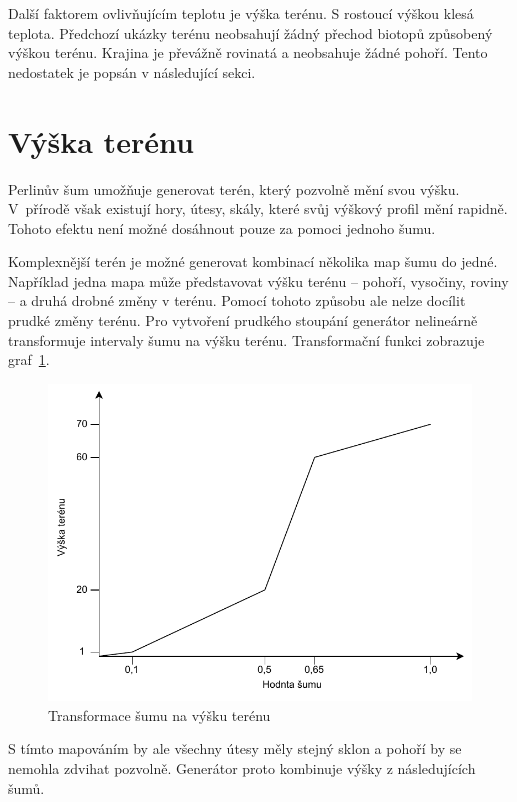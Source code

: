 \documentclass[thesis=M,czech]{FITthesis}[2019/12/23]
\begin{document}
Další faktorem ovlivňujícím teplotu je výška terénu. S rostoucí výškou klesá teplota. Předchozí ukázky terénu neobsahují žádný přechod biotopů způsobený výškou terénu. Krajina je převážně rovinatá a neobsahuje žádné pohoří. Tento nedostatek je popsán v následující sekci.

\section{Výška terénu}

Perlinův šum umožňuje generovat terén, který pozvolně mění svou výšku. V~přírodě však existují hory, útesy, skály, které svůj výškový profil mění rapidně. Tohoto efektu není možné dosáhnout pouze za pomoci jednoho šumu.

Komplexnější terén je možné generovat kombinací několika map šumu do jedné. Například jedna mapa může představovat výšku terénu – pohoří, vysočiny, roviny – a druhá drobné změny v terénu. Pomocí tohoto způsobu ale nelze docílit prudké změny terénu. Pro vytvoření prudkého stoupání generátor nelineárně transformuje intervaly šumu na výšku terénu. Transformační funkci zobrazuje graf~\ref{fig:noise_to_height}.

\begin{figure}\centering
	\includegraphics[width=\textwidth]{images/world_gen/noise_to_height}
	\caption[Transformace šumu na výšku terénu]{Transformace šumu na výšku terénu}\label{fig:noise_to_height}
\end{figure}

S tímto mapováním by ale všechny útesy měly stejný sklon a pohoří by se nemohla zdvihat pozvolně. Generátor proto kombinuje výšky z následujících šumů.
\end{document}
